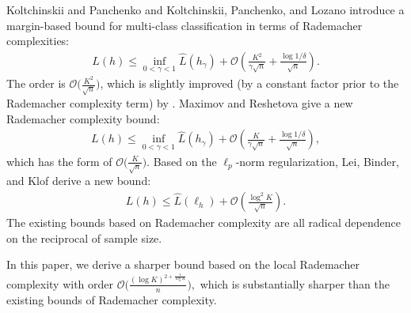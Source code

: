 \documentclass{article}
\begin{document}
Koltchinskii and Panchenko 
and Koltchinskii, Panchenko, and Lozano 
introduce a margin-based bound for multi-class classification in terms of Rademacher complexities:
\begin{align*}
  L(h)\leq \inf_{0<\gamma<1}\hat{L}(h_\gamma)+\mathcal{O}\left(\frac{K^2}{\gamma\sqrt{n}}+\frac{\log1/\delta}{\sqrt{n}}\right).
\end{align*}
The order is $\mathcal{O}\big(\frac{K^2}{\sqrt{n}}\big)$,
which is slightly improved (by a constant factor prior to the Rademacher complexity term)
by \cite{mohri2012foundations,cortes2013multi}.
Maximov and Reshetova  give a new Rademacher complexity bound:
\begin{align*}
  L(h)\leq \inf_{0<\gamma<1}\hat{L}(h_\gamma)+\mathcal{O}
  \left(\frac{K}{\gamma\sqrt{n}}+\frac{\log1/\delta}{\sqrt{n}}\right),
\end{align*}
which has the form of $\mathcal{O}\big(\frac{K}{\sqrt{n}}\big)$.
Based on the $\ell_p$-norm regularization,
Lei, Binder, and Klof  derive a new bound:
\begin{align*}
   L(h)\leq  \hat{L}(\ell_h) +\mathcal{O}\left(\frac{\log^2 K}{\sqrt{n}}\right).
\end{align*}
The existing bounds based on Rademacher complexity are all radical dependence
on the reciprocal of sample size.

In this paper,
we derive a sharper bound based on the local Rademacher complexity with order
$
\mathcal{O}\big(\frac{(\log K)^{2+\frac{1}{\log K}}}{n}\big),
$
which is substantially sharper
than the existing bounds of  Rademacher complexity.
\end{document}
